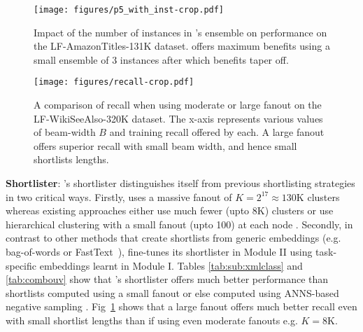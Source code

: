 

\begin{figure}
    \centering
    \begin{minipage}{\linewidth}
		\centering
	   \texttt{[image: figures/p5\_with\_inst-crop.pdf]}
    \caption{Impact of the number of instances in \alg's ensemble on performance on the LF-AmazonTitles-131K dataset. \alg offers maximum benefits using a small ensemble of 3 instances after which benefits taper off.}
    \label{fig:numlearner}
	\end{minipage}
	\begin{minipage}{\linewidth}
		\centering
	   \texttt{[image: figures/recall-crop.pdf]}
    \caption{A comparison of recall when using moderate or large fanout on the LF-WikiSeeAlso-320K dataset. The x-axis represents various values of beam-width $B$ and training recall offered by each. A large fanout offers superior recall with small beam width, and hence small shortlists lengths.}
    \label{fig:recall_clusters}
	\end{minipage}
\end{figure}

\textbf{Shortlister}: \alg's shortlister distinguishes itself from previous shortlisting strategies \cite{Chang20,Khandagale19,You18,Prabhu18b} in two critical ways. Firstly, \alg uses a massive fanout of $K = 2^{17} \approx 130$K clusters whereas existing approaches either use much fewer (upto 8K) clusters \cite{Chang20,Bhatia15} or use hierarchical clustering with a small fanout (upto 100) at each node \cite{Khandagale19,You18}. Secondly, in contrast to other methods that create shortlists from generic embeddings (e.g. bag-of-words or FastText~\citep{Joulin17}), \alg fine-tunes its shortlister in Module II using task-specific embeddings learnt in Module I. Tables \ref{tab:sub:xmlclass} and \ref{tab:combouv} show that \alg's shortlister offers much better performance than shortlists computed using a small fanout or else computed using ANNS-based negative sampling \cite{Jain19}. Fig~\ref{fig:recall_clusters} shows that a large fanout offers much better recall even with small shortlist lengths than if using even moderate fanouts e.g. $K = 8$K.

